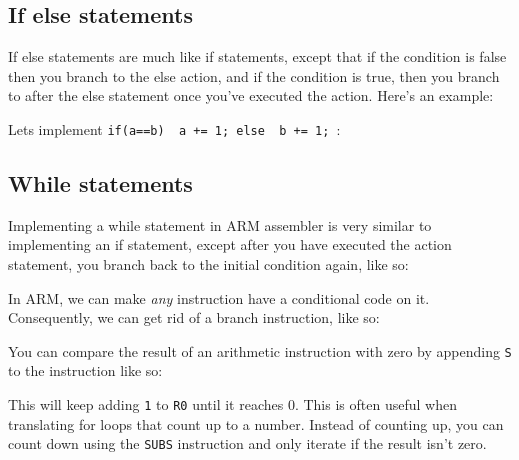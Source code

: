 \subsection{If else statements}

If else statements are much like if statements, except that if the condition is
false then you branch to the else action, and if the condition is true, then you
branch to after the else statement once you've executed the action. Here's an
example:

Lets implement {\tt if(a==b) { a += 1;} else { b += 1; }}:


\subsection{While statements}

Implementing a while statement in ARM assembler is very similar to implementing
an if statement, except after you have executed the action statement, you branch
back to the initial condition again, like so:


In ARM, we can make {\it any} instruction have a conditional code on it.
Consequently, we can get rid of a branch instruction, like so:


You can compare the result of an arithmetic instruction with zero by appending
{\tt S} to the instruction like so:


This will keep adding {\tt 1} to {\tt R0} until it reaches 0. This is often
useful when translating for loops that count up to a number. Instead of counting
up, you can count down using the {\tt SUBS} instruction and only iterate if the
result isn't zero.

